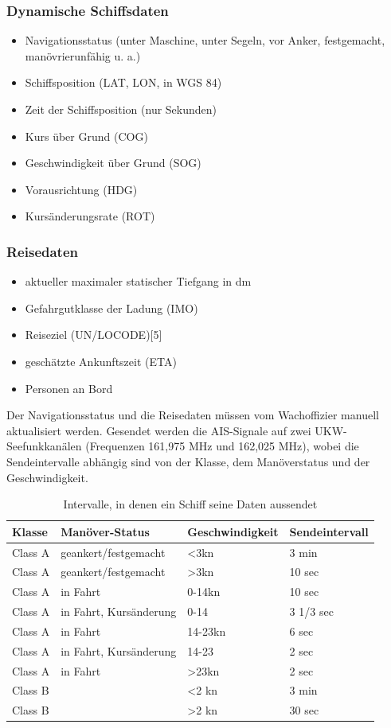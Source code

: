 \subsubsection{Dynamische Schiffsdaten} \label{Dynamische Schiffsdaten}
\begin{itemize}
\item Navigationsstatus (unter Maschine, unter Segeln, vor Anker, festgemacht, manövrierunfähig u. a.)
\item Schiffsposition (LAT, LON, in WGS 84)
\item Zeit der Schiffsposition (nur Sekunden)
\item Kurs über Grund (COG)
\item Geschwindigkeit über Grund (SOG)
\item Vorausrichtung (HDG)
\item Kursänderungsrate (ROT)
\end{itemize}

\subsubsection{Reisedaten} \label{Reisedaten}
\begin{itemize}
\item aktueller maximaler statischer Tiefgang in dm
\item Gefahrgutklasse der Ladung (IMO)
\item Reiseziel (UN/LOCODE)[5]
\item geschätzte Ankunftszeit (ETA)
\item Personen an Bord
\end{itemize}

Der Navigationsstatus und die Reisedaten müssen vom Wachoffizier manuell aktualisiert werden. Gesendet werden die AIS-Signale auf zwei UKW-Seefunkkanälen (Frequenzen 161,975 MHz und 162,025 MHz), wobei die Sendeintervalle abhängig sind von der Klasse, dem Manöverstatus und der Geschwindigkeit.

\begin{table}[!hbt]\vspace{1ex}\centering
\begin{tabular}{|l|l|l|l|}\hline
Klasse &Manöver-Status & Geschwindigkeit &Sendeintervall\\\hline\hline
Class A&geankert/festgemacht&<3kn&3 min\\
Class A&geankert/festgemacht&>3kn&10 sec\\
Class A&in Fahrt&0-14kn&10 sec\\
Class A&in Fahrt, Kursänderung&0-14&3 1/3 sec\\
Class A&in Fahrt&14-23kn&6 sec\\
Class A&in Fahrt, Kursänderung&14-23&2 sec\\
Class A&in Fahrt&>23kn&2 sec\\
Class B&&<2 kn&3 min\\
Class B&&>2 kn&30 sec\\\hline
\end{tabular}
\caption[Intervalle, in denen ein Schiff seine Daten aussendet] {Intervalle, in denen ein Schiff seine Daten aussendet}
\end{table}

